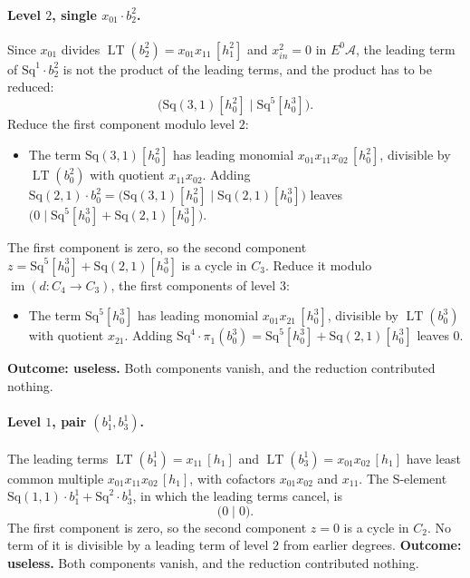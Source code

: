 \documentclass[11pt]{article}
\newcommand{\Sq}{\mathrm{Sq}}
\newcommand{\A}{\mathcal{A}}
\DeclareMathOperator{\LT}{LT}
\begin{document}
\paragraph{Level $2$, single $x_{01}\cdot b^{2}_{2}$.} Since $x_{01}$ divides $\LT(b^{2}_{2}) = x_{01}x_{11}\,[h_1^2]$ and $x_{in}^2 = 0$ in $E^0\A$, the leading term of $\Sq^{1}\cdot b^{2}_{2}$ is not the product of the leading terms, and the product has to be reduced:
\[\bigl(\Sq(3,1)[h_0^2] \;\big|\; \Sq^{5}[h_0^3]\bigr).\]
Reduce the first component modulo level $2$:
\begin{itemize}
\item The term $\Sq(3,1)[h_0^2]$ has leading monomial $x_{01}x_{11}x_{02}\,[h_0^2]$, divisible by $\LT(b^{2}_{0})$ with quotient $x_{11}x_{02}$. Adding $\Sq(2,1)\cdot b^{2}_{0} = \bigl(\Sq(3,1)[h_0^2] \;\big|\; \Sq(2,1)[h_0^3]\bigr)$ leaves $\bigl(0 \;\big|\; \Sq^{5}[h_0^3] + \Sq(2,1)[h_0^3]\bigr)$.
\end{itemize}
The first component is zero, so the second component $z = \Sq^{5}[h_0^3] + \Sq(2,1)[h_0^3]$ is a cycle in $C_{3}$.
Reduce it modulo $\operatorname{im}(d\colon C_{4}\to C_{3})$, the first components of level $3$:
\begin{itemize}
\item The term $\Sq^{5}[h_0^3]$ has leading monomial $x_{01}x_{21}\,[h_0^3]$, divisible by $\LT(b^{3}_{0})$ with quotient $x_{21}$. Adding $\Sq^{4}\cdot \pi_1(b^{3}_{0}) = \Sq^{5}[h_0^3] + \Sq(2,1)[h_0^3]$ leaves $0$.
\end{itemize}
\textbf{Outcome: useless.} Both components vanish, and the reduction contributed nothing.
\medskip
\paragraph{Level $1$, pair $(b^{1}_{1}, b^{1}_{3})$.} The leading terms $\LT(b^{1}_{1}) = x_{11}\,[h_1]$ and $\LT(b^{1}_{3}) = x_{01}x_{02}\,[h_1]$ have least common multiple $x_{01}x_{11}x_{02}\,[h_1]$, with cofactors $x_{01}x_{02}$ and $x_{11}$. The S-element $\Sq(1,1)\cdot b^{1}_{1} + \Sq^{2}\cdot b^{1}_{3}$, in which the leading terms cancel, is
\[\bigl(0 \;\big|\; 0\bigr).\]
The first component is zero, so the second component $z = 0$ is a cycle in $C_{2}$.
No term of it is divisible by a leading term of level $2$ from earlier degrees.
\textbf{Outcome: useless.} Both components vanish, and the reduction contributed nothing.
\medskip
\end{document}
